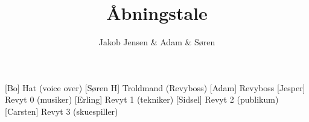 \documentclass[a4paper,11pt]{article}
\title{Åbningstale}
\author{Jakob Jensen \& Adam \& Søren}
\begin{document}
\maketitle

\begin{roles}
  [Bo] Hat (voice over) 
  [Søren H] Troldmand (Revyboss)
  [Adam] Revyboss
  [Jesper] Revyt 0 (musiker)
  [Erling] Revyt 1 (tekniker)
  [Sidsel] Revyt 2 (publikum)
  [Carsten] Revyt 3 (skuespiller)
\end{roles}

\begin{props}
\end{props}
\end{document}
